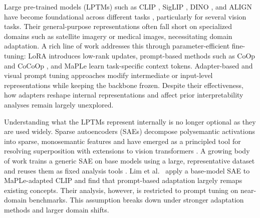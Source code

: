 
Large pre-trained models (LPTMs) such as CLIP \citep{radford2021learning}, SigLIP \citep{zhai2023sigmoid}, DINO \citep{caron2021emerging}, and ALIGN \citep{jia2021scaling} have become foundational across different tasks \citep{bommasani2021opportunities}, particularly for several vision tasks. Their general-purpose representations often fall short on specialized domains such as satellite imagery or medical images, necessitating domain adaptation. A rich line of work addresses this through parameter-efficient fine-tuning: LoRA \citep{hu2022lora} introduces low-rank updates, prompt-based methods such as CoOp and CoCoOp \citep{zhou2022learning,zhou2022conditional}, and MaPLe \citep{khattak2023maple} learn task-specific context tokens. Adapter-based \citep{gao2024clipadapter} and visual prompt tuning \citep{jia2022visual} approaches modify intermediate or input-level representations while keeping the backbone frozen. Despite their effectiveness, how adapters reshape internal representations and affect prior interpretability analyses remain largely unexplored.

Understanding what the LPTMs represent internally is no longer optional \citep{rauker2023transparent, kim2018interpretability} as they are used widely. Sparse autoencoders (SAEs) decompose polysemantic activations into sparse, monosemantic features and have emerged as a principled tool for resolving superposition \citep{cunningham2024sparse, rajamanoharan2024improving} with extensions to vision transformers \citep{gandelsman2024interpreting, gao2025scaling}. A growing body of work trains a generic SAE on base models using a large, representative dataset and reuses them as fixed analysis tools \citep{rao2024discover, karvonen2025saevision, pach2025monosemantic}. Lim et al.\ \citep{lim2024patchsae} apply a base-model SAE to MaPLe-adapted CLIP and find that prompt-based adaptation largely remaps existing concepts. Their analysis, however, is restricted to prompt tuning on near-domain benchmarks. This assumption breaks down under stronger adaptation methods and larger domain shifts.




